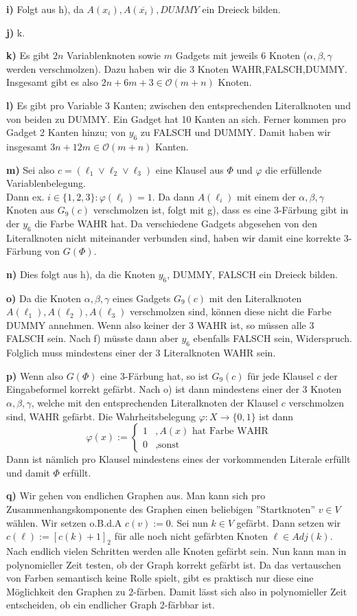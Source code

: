 \documentclass[a4paper,graphics,11pt]{article}
\begin{document}
\textbf{i)}
Folgt aus h), da $A(x_i), A(\overline{x_i}), DUMMY$ ein Dreieck bilden.

\textbf{j)} k.

\textbf{k)}
Es gibt $2n$ Variablenknoten sowie $m$ Gadgets mit jeweils 6 Knoten ($\alpha,\beta,\gamma$ werden verschmolzen).
Dazu haben wir die 3 Knoten WAHR,FALSCH,DUMMY.
Insgesamt gibt es also $2n+6m+3 \in \mathcal{O}(m+n)$ Knoten.

\textbf{l)}
Es gibt pro Variable 3 Kanten; zwischen den entsprechenden Literalknoten und von beiden zu DUMMY. Ein Gadget hat 10 Kanten
an sich. Ferner kommen pro Gadget 2 Kanten hinzu; von $y_6$ zu FALSCH und DUMMY.
Damit haben wir insgesamt $3n+12m \in \mathcal{O}(m+n)$ Kanten.

\textbf{m)}
Sei also $c = (\ell_1 \lor \ell_2 \lor \ell_3)$ eine Klausel aus $\Phi$ und $\varphi$ die erfüllende Variablenbelegung.\\
Dann ex. $i \in \{1,2,3\}: \varphi(\ell_i) = 1$. Da dann $A(\ell_i)$ mit einem der $\alpha,\beta,\gamma$ Knoten aus $G_9(c)$
verschmolzen ist, folgt mit g), dass es eine 3-Färbung gibt in der $y_6$ die Farbe WAHR hat.
Da verschiedene Gadgets abgesehen von den Literalknoten nicht miteinander verbunden sind, haben wir damit
eine korrekte 3-Färbung von $G(\Phi)$.

\textbf{n)}
Dies folgt aus h), da die Knoten $y_6$, DUMMY, FALSCH ein Dreieck bilden.

\textbf{o)}
Da die Knoten $\alpha,\beta,\gamma$ eines Gadgets $G_9(c)$ mit den Literalknoten $A(\ell_1),A(\ell_2),A(\ell_3)$ verschmolzen
sind, können diese nicht die Farbe DUMMY annehmen. Wenn also keiner der 3 WAHR ist, so müssen alle 3 FALSCH sein.
Nach f) müsste dann aber $y_6$ ebenfalls FALSCH sein, Widerspruch. Folglich muss mindestens einer der 3 Literalknoten WAHR sein.

\textbf{p)}
Wenn also $G(\Phi)$ eine 3-Färbung hat, so ist $G_9(c)$ für jede Klausel $c$ der Eingabeformel korrekt gefärbt.
Nach o) ist dann mindestens einer der 3 Knoten $\alpha,\beta,\gamma$, welche mit den entsprechenden Literalknoten der Klausel $c$
verschmolzen sind, WAHR gefärbt. Die Wahrheitsbelegung $\varphi : X \to \{0,1\}$ ist dann
$$
    \varphi(x) := \begin{cases}
        1 &, A(x) \text{ hat Farbe WAHR}\\
        0 &,\text{sonst}
    \end{cases}
$$
Dann ist nämlich pro Klausel mindestens eines der vorkommenden Literale erfüllt und damit $\Phi$ erfüllt.

\newpage

\textbf{q)}
Wir gehen von endlichen Graphen aus.
Man kann sich pro Zusammenhangskomponente des Graphen einen beliebigen ''Startknoten'' $v \in V$ wählen.
Wir setzen o.B.d.A $c(v) := 0$. Sei nun $k \in V$ gefärbt. Dann setzen wir $c(\ell) := [c(k)+1]_2$ für alle noch nicht
gefärbten Knoten $\ell \in Adj(k)$.
Nach endlich vielen Schritten werden alle Knoten gefärbt sein. Nun kann man in polynomieller Zeit testen, ob der Graph
korrekt gefärbt ist.
Da das vertauschen von Farben semantisch keine Rolle spielt, gibt es praktisch nur diese eine Möglichkeit den Graphen zu 2-färben.
Damit lässt sich also in polynomieller Zeit entscheiden, ob ein endlicher Graph 2-färbbar ist.
\end{document}
